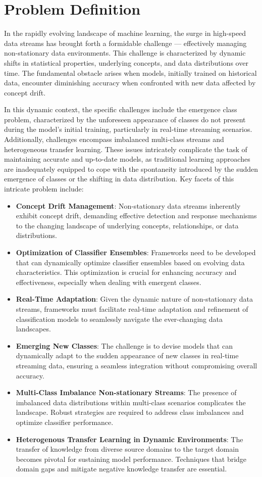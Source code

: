 \section{Problem Definition}
\label{sec:1_introduction_problem}
In the rapidly evolving landscape of machine learning, the surge in high-speed data streams has brought forth a formidable challenge — effectively managing non-stationary data environments. This challenge is characterized by dynamic shifts in statistical properties, underlying concepts, and data distributions over time. The fundamental obstacle arises when models, initially trained on historical data, encounter diminishing accuracy when confronted with new data affected by concept drift.

In this dynamic context, the specific challenges include the emergence class problem, characterized by the unforeseen appearance of classes do not present during the model's initial training, particularly in real-time streaming scenarios. Additionally, challenges encompass imbalanced multi-class streams and heterogeneous transfer learning. These issues intricately complicate the task of maintaining accurate and up-to-date models, as traditional learning approaches are inadequately equipped to cope with the spontaneity introduced by the sudden emergence of classes or the shifting in data distribution. Key facets of this intricate problem include:
\begin{itemize}
    \item \textbf{Concept Drift Management}: Non-stationary data streams inherently exhibit concept drift, demanding effective detection and response mechanisms to the changing landscape of underlying concepts, relationships, or data distributions.
    \item \textbf{Optimization of Classifier Ensembles}: Frameworks need to be developed that can dynamically optimize classifier ensembles based on evolving data characteristics. This optimization is crucial for enhancing accuracy and effectiveness, especially when dealing with emergent classes.
    \item \textbf{Real-Time Adaptation}: Given the dynamic nature of non-stationary data streams, frameworks must facilitate real-time adaptation and refinement of classification models to seamlessly navigate the ever-changing data landscapes.
    \item \textbf{Emerging New Classes}: The challenge is to devise models that can dynamically adapt to the sudden appearance of new classes in real-time streaming data, ensuring a seamless integration without compromising overall accuracy.
    \item \textbf{Multi-Class Imbalance Non-stationary Streams}: The presence of imbalanced data distributions within multi-class scenarios complicates the landscape. Robust strategies are required to address class imbalances and optimize classifier performance.
    \item \textbf{Heterogenous Transfer Learning in Dynamic Environments}: The transfer of knowledge from diverse source domains to the target domain becomes pivotal for sustaining model performance. Techniques that bridge domain gaps and mitigate negative knowledge transfer are essential.
\end{itemize}
